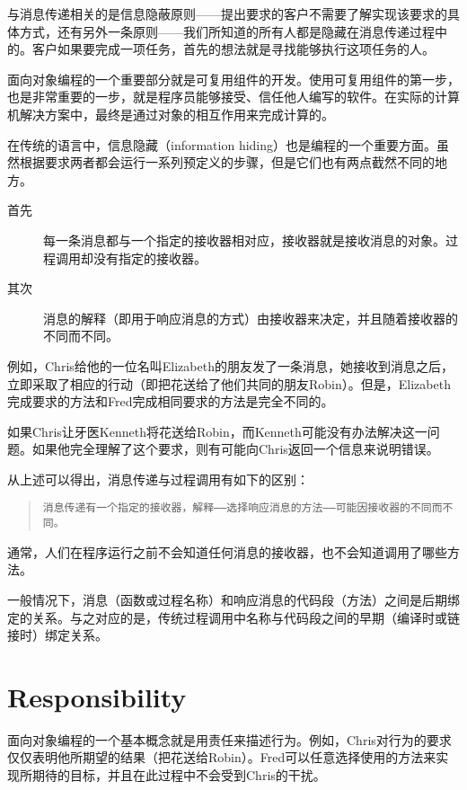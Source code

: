与消息传递相关的是信息隐蔽原则——提出要求的客户不需要了解实现该要求的具体方式，还有另外一条原则——我们所知道的所有人都是隐藏在消息传递过程中的。客户如果要完成一项任务，首先的想法就是寻找能够执行这项任务的人。


面向对象编程的一个重要部分就是可复用组件的开发。使用可复用组件的第一步，也是非常重要的一步，就是程序员能够接受、信任他人编写的软件。在实际的计算机解决方案中，最终是通过对象的相互作用来完成计算的。

在传统的语言中，信息隐藏（information hiding）也是编程的一个重要方面。虽然根据要求两者都会运行一系列预定义的步骤，但是它们也有两点截然不同的地方。

\begin{description}
\item[首先] 每一条消息都与一个指定的接收器相对应，接收器就是接收消息的对象。过程调用却没有指定的接收器。
\item[其次] 消息的解释（即用于响应消息的方式）由接收器来决定，并且随着接收器的不同而不同。
\end{description}

例如，Chris给他的一位名叫Elizabeth的朋友发了一条消息，她接收到消息之后，立即采取了相应的行动（即把花送给了他们共同的朋友Robin）。但是，Elizabeth完成要求的方法和Fred完成相同要求的方法是完全不同的。

如果Chris让牙医Kenneth将花送给Robin，而Kenneth可能没有办法解决这一问题。如果他完全理解了这个要求，则有可能向Chris返回一个信息来说明错误。

从上述可以得出，消息传递与过程调用有如下的区别：

\begin{quote}
\texttt{消息传递有一个指定的接收器，解释——选择响应消息的方法——可能因接收器的不同而不同。}
\end{quote}

通常，人们在程序运行之前不会知道任何消息的接收器，也不会知道调用了哪些方法。

一般情况下，消息（函数或过程名称）和响应消息的代码段（方法）之间是后期绑定的关系。与之对应的是，传统过程调用中名称与代码段之间的早期（编译时或链接时）绑定关系。

\section{Responsibility}


面向对象编程的一个基本概念就是用责任来描述行为。例如，Chris对行为的要求仅仅表明他所期望的结果（把花送给Robin）。Fred可以任意选择使用的方法来实现所期待的目标，并且在此过程中不会受到Chris的干扰。

